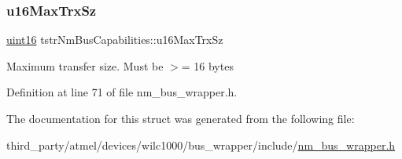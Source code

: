 \subsubsection{\texorpdfstring{u16\+Max\+Trx\+Sz}{u16MaxTrxSz}}
{\footnotesize\ttfamily \hyperlink{group__DataT_ga1daa745171fc6e31d942c161422a76f9}{uint16} tstr\+Nm\+Bus\+Capabilities\+::u16\+Max\+Trx\+Sz}

Maximum transfer size. Must be $>$= 16 bytes 

Definition at line 71 of file nm\+\_\+bus\+\_\+wrapper.\+h.



The documentation for this struct was generated from the following file\+:\begin{DoxyCompactItemize}
\item 
third\+\_\+party/atmel/devices/wilc1000/bus\+\_\+wrapper/include/\hyperlink{nm__bus__wrapper_8h}{nm\+\_\+bus\+\_\+wrapper.\+h}\end{DoxyCompactItemize}

